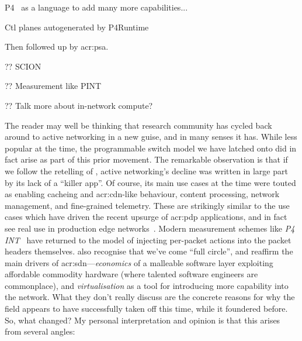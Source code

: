 P4~\parencite{DBLP:journals/ccr/BosshartDGIMRSTVVW14} as a language to add many more capabilities...

Ctl planes autogenerated by P4Runtime~\parencite{p4-runtime}

Then followed up by  \gls{acr:psa}\parencite{p4-psa}.

?? SCION~\parencite{DBLP:conf/conext/RuiterS21}

?? Measurement like PINT~\parencite{DBLP:conf/sigcomm/BasatRLAYM20}

?? Talk more about in-network compute?

The reader may well be thinking that research community has cycled back around to active networking in a new guise, and in many senses it has.
While less popular at the time, the programmable switch model we have latched onto did in fact arise as part of this prior movement.
The remarkable observation is that if we follow the retelling of \Textcite{DBLP:journals/ccr/FeamsterRZ14}, active networking's decline was written in large part by its lack of a ``killer app''.
Of course, its main use cases at the time were touted as enabling cacheing and \gls{acr:cdn}-like behaviour, content processing, network management, and fine-grained telemetry.
These are strikingly similar to the use cases which have driven the recent upsurge of \gls{acr:pdp} applications, and in fact see real use in production edge networks~\parencite{DBLP:conf/sigcomm/TianGLZCZDYMTLW21}.
Modern measurement schemes like \emph{P4 INT}~\parencite{p4-int} have returned to the model of injecting per-packet actions into the packet headers themselves.
\Textcite{DBLP:journals/ccr/WetherallT19} also recognise that we've come ``full circle'', and reaffirm the main drivers of \gls{acr:sdn}---\emph{economics} of a malleable software layer exploiting affordable commodity hardware (where talented software engineers are commonplace), and \emph{virtualisation} as a tool for introducing more capability into the network.
What they don't really discuss are the concrete reasons for why the field appears to have successfully taken off this time, while it foundered before.
So, what changed?
My personal interpretation and opinion is that this arises from several angles: 
